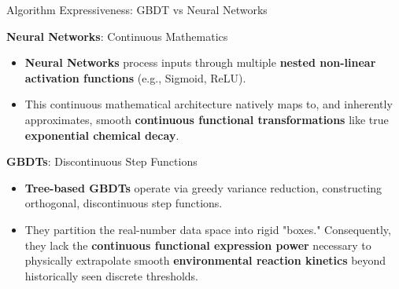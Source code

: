 \documentclass[xcolor=dvipsnames]{beamer}
\begin{document}
\begin{frame}{Algorithm Expressiveness: GBDT vs Neural Networks}
  \small
  \begin{block}{\textbf{Neural Networks}: Continuous Mathematics}
      \begin{itemize}
          \item \textbf{Neural Networks} process inputs through multiple \textbf{nested non-linear activation functions} (e.g., Sigmoid, ReLU). 
          \item This continuous mathematical architecture natively maps to, and inherently approximates, smooth \textbf{continuous functional transformations} like true \textbf{exponential chemical decay}.
      \end{itemize}
  \end{block}
  \begin{block}{\textbf{GBDTs}: Discontinuous Step Functions}
      \begin{itemize}
          \item \textbf{Tree-based GBDTs} operate via greedy variance reduction, constructing orthogonal, discontinuous step functions.
          \item They partition the real-number data space into rigid "boxes." Consequently, they lack the \textbf{continuous functional expression power} necessary to physically extrapolate smooth \textbf{environmental reaction kinetics} beyond historically seen discrete thresholds.
      \end{itemize}
  \end{block}
\end{frame}
\end{document}
